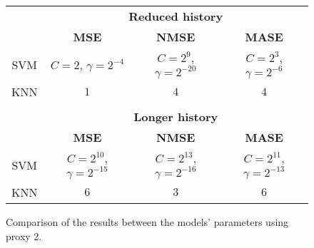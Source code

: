 \begin{figure}[!h]
\centering
\begin{tabular}{|c|c|c|c|}
\hline
    & \multicolumn{3}{|c|}{\textbf{Reduced history}} \\ \cline{2-4}
    & \textbf{MSE} & \textbf{NMSE} & \textbf{MASE}          \\ \hline
    SVM  & $C = 2$, $\gamma = 2^{-4}$&  $C = 2^9$, $\gamma = 2^{-20}$& $C = 2^3$, $\gamma = 2^{-6}$ \\ 
    KNN & $1$ &$4$ &$4$         \\ 
    \hline
\multicolumn{4}{c}{\textbf{}} \\ \cline{1-4}
    & \multicolumn{3}{|c|}{\textbf{Longer history}} \\ \cline{2-4}
    & \textbf{MSE} & \textbf{NMSE} & \textbf{MASE}          \\ \hline
    SVM  & $C = 2^{10}$, $\gamma = 2^{-15}$  & $C = 2^{13}$, $\gamma = 2^{-16}$&  $C = 2^{11}$, $\gamma = 2^{-13}$ \\ 
    KNN & $6$ &$3$ &$6$         \\ \hline
\end{tabular}
\caption{Comparison of the results between the models' parameters using proxy 2.}
\label{fig:comparep2}
\end{figure}